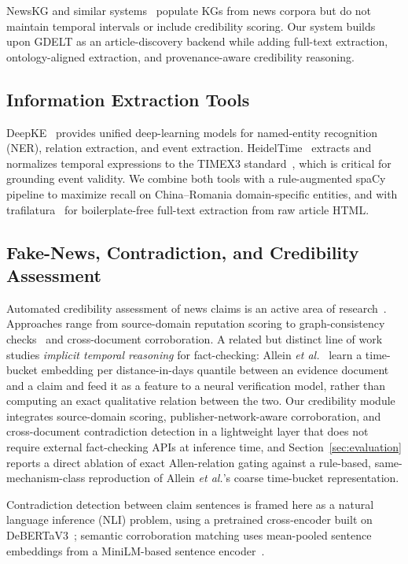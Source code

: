 \documentclass[conference]{IEEEtran}
\begin{document}
NewsKG and similar systems~\cite{fader2011reverb} populate KGs from news
corpora but do not maintain temporal intervals or include credibility scoring.
Our system builds upon GDELT as an article-discovery backend while adding
full-text extraction, ontology-aligned extraction, and provenance-aware
credibility reasoning.

\subsection{Information Extraction Tools}

DeepKE~\cite{zhang2022deepke} provides unified deep-learning models for
named-entity recognition (NER), relation extraction, and event extraction.
HeidelTime~\cite{strotgen2010heideltime} extracts and normalizes temporal
expressions to the TIMEX3 standard~\cite{pustejovsky2003timex3}, which is
critical for grounding event validity. We combine both tools with a
rule-augmented spaCy pipeline to maximize recall on China--Romania
domain-specific entities, and with trafilatura~\cite{barbaresi2021trafilatura}
for boilerplate-free full-text extraction from raw article HTML.

\subsection{Fake-News, Contradiction, and Credibility Assessment}

Automated credibility assessment of news claims is an active area of
research~\cite{shu2019fakenews}. Approaches range from source-domain
reputation scoring to graph-consistency checks~\cite{popat2018credeyecontrib}
and cross-document corroboration. A related but distinct line of work
studies \emph{implicit temporal reasoning} for fact-checking: Allein
\textit{et al.}~\cite{allein2023implicit} learn a time-bucket embedding per
distance-in-days quantile between an evidence document and a claim and feed
it as a feature to a neural verification model, rather than computing an
exact qualitative relation between the two. Our credibility module integrates
source-domain scoring, publisher-network-aware corroboration, and
cross-document contradiction detection in a lightweight layer that does not
require external fact-checking APIs at inference time, and Section~\ref{sec:evaluation}
reports a direct ablation of exact Allen-relation gating against a rule-based,
same-mechanism-class reproduction of Allein \textit{et al.}'s coarse
time-bucket representation.

Contradiction detection between claim sentences is framed here as a natural
language inference (NLI) problem, using a pretrained cross-encoder built on
DeBERTaV3~\cite{he2021debertav3}; semantic corroboration matching uses
mean-pooled sentence embeddings from a MiniLM-based sentence encoder~\cite{wang2020minilm}.
\end{document}
